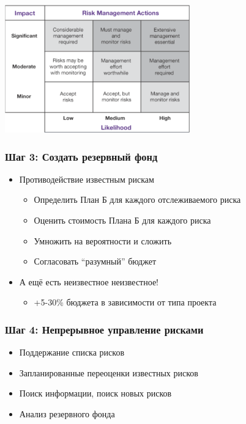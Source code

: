 \documentclass{../../slides-style}
\begin{document}
    \begin{frame}
        \begin{center}
            \includegraphics[width=0.6\textwidth]{riskMatrix.png}
        \end{center}
    \end{frame}

    \begin{frame}
        \frametitle{Шаг 3: Создать резервный фонд}
        \begin{itemize}
            \item Противодействие известным рискам
            \begin{itemize}
                \item Определить План Б для каждого отслеживаемого риска
                \item Оценить стоимость Плана Б для каждого риска
                \item Умножить на вероятности и сложить
                \item Согласовать ``разумный'' бюджет
            \end{itemize}
            \item А ещё есть неизвестное неизвестное!
            \begin{itemize}
                \item +5-30\% бюджета в зависимости от типа проекта
            \end{itemize}
        \end{itemize}
    \end{frame}

    \begin{frame}
        \frametitle{Шаг 4: Непрерывное управление рисками}
        \begin{itemize}
            \item Поддержание списка рисков
            \item Запланированные переоценки известных рисков
            \item Поиск информации, поиск новых рисков
            \item Анализ резервного фонда
        \end{itemize}
    \end{frame}
\end{document}
